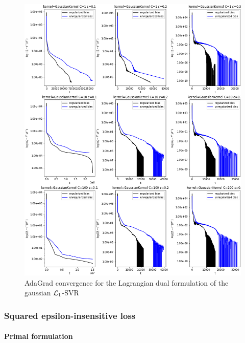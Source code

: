 \begin{figure}[H]
	\centering
	\includegraphics[scale=0.55]{img/gaussian_lagrangian_dual_l1_svr_loss_history}
	\caption{AdaGrad convergence for the Lagrangian dual formulation of the gaussian $\protect \mathcal{L}_1$-SVR}
	\label{fig:gaussian_lagrangian_dual_l1_svr_loss_history}
\end{figure}

\pagebreak

\subsubsection{Squared epsilon-insensitive loss}

\paragraph{Primal formulation}


